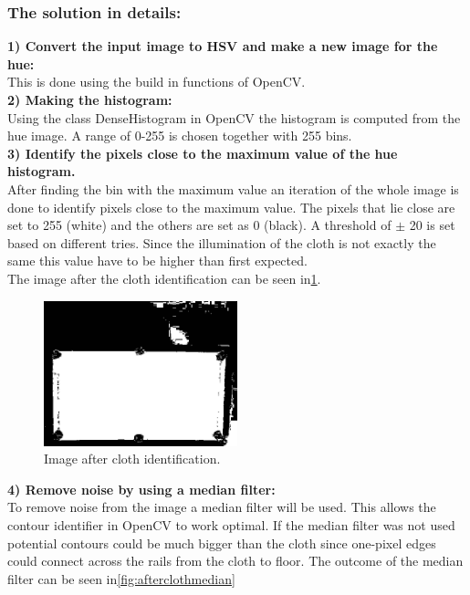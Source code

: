 \subsubsection{The solution in details:}
\textbf{1) Convert the input image to HSV and make a new image for the hue:}\\
This is done using the build in functions of OpenCV\cite{opencv}.\\

\textbf{2) Making the histogram:}\\
Using the class DenseHistogram in OpenCV\cite{opencv} the histogram is computed from the hue image. A range of 0-255 is chosen together with 255 bins.\\

\textbf{3) Identify the pixels close to the maximum value of the hue histogram.}\\
After finding the bin with the maximum value an iteration of the whole image is done to identify pixels close to the maximum value. The pixels that lie close are set to 255 (white) and the others are set as 0 (black). A threshold of $\pm$ 20 is set based on different tries. Since the illumination of the cloth is not exactly the same this value have to be higher than first expected.\\

The image after the cloth identification can be seen in\ref{fig:aftercloth}.

\begin{figure}[H]
\begin{center}
\leavevmode
\includegraphics[width=0.5\textwidth]{images/aftercloth}
\end{center}
\caption{Image after cloth identification.}
\label{fig:aftercloth}
\end{figure}

\textbf{4) Remove noise by using a median filter:}\\
To remove noise from the image a median filter will be used. This allows the contour identifier in OpenCV\cite{opencv} to work optimal. If the median filter was not used potential contours could be much bigger than the cloth since one-pixel edges could connect across the rails from the cloth to floor. The outcome of the median filter can be seen in\ref{fig:afterclothmedian}

